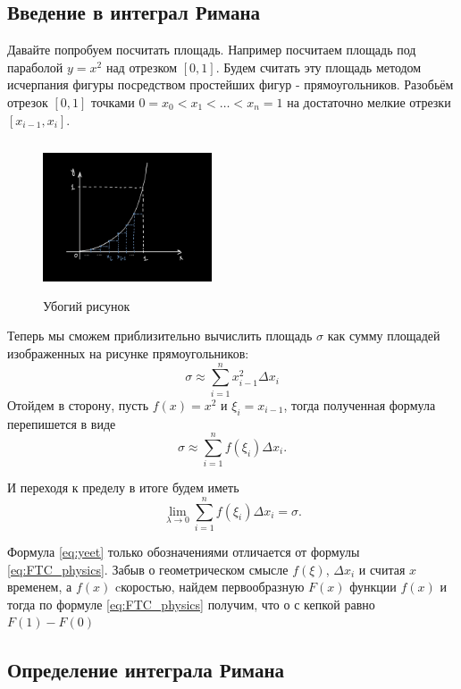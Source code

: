 \documentclass[a4paper,14pt]{article} %
\begin{document}
	\subsection{Введение в интеграл Римана}
	Давайте попробуем посчитать площадь. Например посчитаем площадь под параболой \( y=x^2 \) над отрезком \( [0, 1] \). Будем считать эту площадь методом исчерпания фигуры посредством простейших фигур - прямоугольников.
	Разобьём отрезок \( [0, 1] \) точками \( 0=x_0 < x_1 < \dots < x_n = 1 \) на достаточно мелкие отрезки \( [x_{i-1}, x_i] \).
	
	\begin{figure}[h]
	\centering
    \includegraphics[width=5cm, height=4.5cm]{Integral_of_Archimedes.jpg}
    \caption{Убогий рисунок}
    \end{figure}
	
	\noindent 
	Теперь мы сможем приблизительно вычислить площадь \( \sigma \) как сумму площадей изображенных на рисунке прямоугольников:
	\[
	\sigma \approx \sum_{i=1}^{n}{x_{i-1}^{2}\Delta x_i}
	\]
	Отойдем в сторону, пусть \(f(x) = x^2 \) и \( \xi_i=x_{i-1} \), тогда полученная формула перепишется в виде 
	\begin{equation}\label{eq:for_integral_sum}
	    \sigma \approx \sum_{i=1}^{n}{f(\xi_i)\Delta x_i}.
	\end{equation}

	И переходя к пределу в итоге будем иметь
	\begin{equation}\label{eq:yeet}
	    \lim_{\lambda\to 0}{\sum_{i=1}^{n}{f(\xi_i)\Delta x_i}} = \sigma.
	\end{equation}
	
	\noindent
	Формула \eqref{eq:yeet} только обозначениями отличается от формулы \eqref{eq:FTC_physics}. Забыв о геометрическом смысле \(f(\xi) \), \( \Delta x_i \) и считая \( x \) временем, а \(f(x) \) cкоростью, найдем первообразную \( F(x) \) функции \(f(x) \) и тогда по формуле \eqref{eq:FTC_physics} получим, что о с кепкой равно \( F(1) - F(0) \)
	
	
	\subsection{Определение интеграла Римана}
\end{document}
